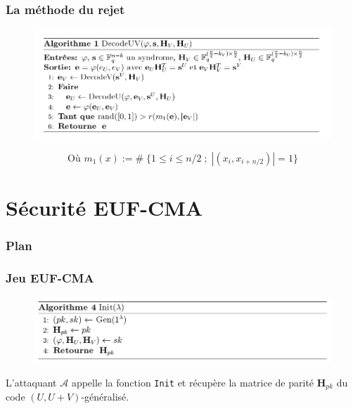 \documentclass[10pt,a4paper]{beamer}
\theoremstyle{plain}
\theoremstyle{definition}
\begin{document}
\begin{frame}[fragile]
\frametitle{La méthode du rejet}
\vspace{-0.3in}
\begin{figure}[h]
\begin{center}
\includegraphics [scale=0.38]{algo_uv.png}
\end{center}
\end{figure}
$$ \text{Où  } m_1(x) := \# \; \{1  \leq i \leq n/2 \;;\; |(x_i, x_{i+n/2})| = 1\}$$
\end{frame}


\section{Sécurité EUF-CMA}

\begin{frame}
  \frametitle{Plan}
  \tableofcontents[currentsection,subsectionstyle=hide]
\end{frame}

\begin{frame}[fragile]
\frametitle{Jeu EUF-CMA}	
\begin{figure}[h]
		\includegraphics[width=\textwidth]{init.png}
\end{figure}

\vspace{0.1in}

L'attaquant $\mathcal{A}$ appelle la fonction \verb|Init| et récupère la matrice de parité $\mathbf{H}_{pk}$ du code $(U,U+V)$-généralisé.
\end{frame}
\end{document}
